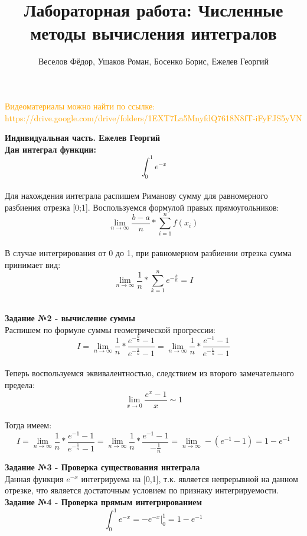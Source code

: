 \documentclass{beamer}
\title[]{Лабораторная работа: Численные методы вычисления интегралов}
\author[]{Веселов Фёдор, Ушаков Роман, Босенко Борис, Ежелев Георгий}
\begin{document}
	\begin{frame}
		\titlepage
	\end{frame}
	
	\begin{frame}
		\textcolor{orange}{\large{Видеоматериалы можно найти по ссылке: https://drive.google.com/drive/folders/1EXT7La5MnyfdQ7618N8fT-iFyFJS5yVN}}\\[1cm]
	\end{frame}
	
	\begin{frame}
		\large \textbf{\textcolor{structure.fg}{Индивидуальная часть. Ежелев Георгий}}\\
		\textbf{Дан интеграл функции: } \[\int_{0}^{1}  e^{-x}\]\\
		Для нахождения интеграла распишем Риманову сумму для равномерного разбиения отрезка [0;1]. Воспользуемся формулой правых прямоугольников:\\
		\[\lim_{n \to \infty}\frac{b-a}{n}*\sum_{i=1}^{n}f(x_i)\]\\
		В случае интегрирования от 0 до 1, при равномерном разбиении отрезка сумма принимает вид:\\
		\[\lim_{n \to \infty} \frac{1}{n} * \sum_{k=1}^{n} e^{-\frac{k}{n}} = I\]\\
	\end{frame}
	\begin{frame}
	\large \textbf{\textcolor{structure.fg}{Задание №2 - вычисление суммы}}\\
	Распишем по формуле суммы геометрической прогрессии:\\
	\[I = \lim_{n \to \infty} \frac{1}{n} * \frac{e^{-\frac{n}{n}} - 1 }{e^{-\frac{1}{n}} - 1} = \lim_{n \to \infty} \frac{1}{n} * \frac{e^{-1} - 1 }{e^{-\frac{1}{n}} - 1}\]\\
	Теперь воспользуемся эквивалентностью, следствием из второго замечательного предела:
	\[\lim_{x \to 0} \frac{e^{x} - 1}{x} \sim 1\]\\
	Тогда имеем:
	\[I = \lim_{n \to \infty} \frac{1}{n} * \frac{e^{-1} - 1 }{e^{-\frac{1}{n}} - 1} =\lim_{n \to \infty} \frac{1}{n} * \frac{e^{-1} - 1}{-\frac{1}{n}} = \lim_{n \to \infty} -(e^{-1} - 1) = \boxed{1 - e^{-1}}\]
	\end{frame}
	\begin{frame}
		\large \textbf{\textcolor{structure.fg}{Задание №3 - Проверка существования интеграла}}\\
	Данная функция \(e^{-x}\) интегрируема на [0,1], т.к. является непрерывной на данном отрезке, что является достаточным условием по признаку интегрируемости.\\
	\large \textbf{\textcolor{structure.fg}{Задание №4 - Проверка прямым интегрированием}}\\
	\[\int_{0}^{1}  e^{-x} = -e^{-x}\Big\vert_{0}^{1} = \boxed{1 - e^{-1}}\]\\
\end{frame}
\end{document}

